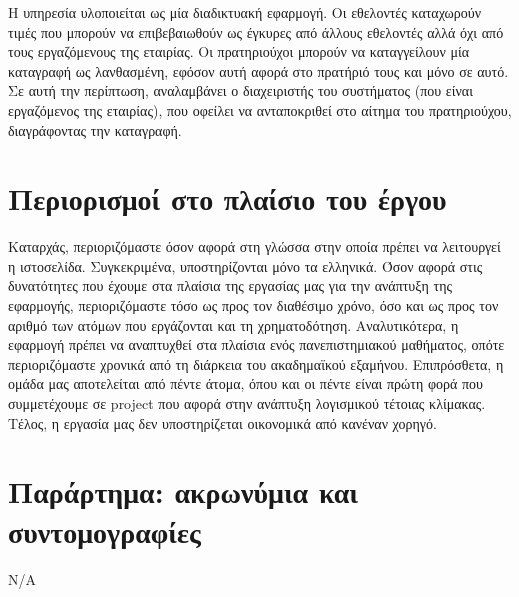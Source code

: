 \documentclass[a4paper,oneside, 12pt]{article}
\begin{document}
Η υπηρεσία υλοποιείται ως μία διαδικτυακή εφαρμογή. Οι εθελοντές
καταχωρούν τιμές που μπορούν να επιβεβαιωθούν ως έγκυρες από άλλους
εθελοντές αλλά όχι από τους εργαζόμενους της εταιρίας. Οι πρατηριούχοι
μπορούν να καταγγείλουν μία καταγραφή ως λανθασμένη, εφόσον αυτή αφορά
στο πρατήριό τους και μόνο σε αυτό. Σε αυτή την περίπτωση, αναλαμβάνει ο
διαχειριστής του συστήματος (που είναι εργαζόμενος της εταιρίας), που οφείλει
να ανταποκριθεί στο αίτημα του πρατηριούχου, διαγράφοντας την καταγραφή.

\section{Περιορισμοί στο πλαίσιο του έργου}

Καταρχάς, περιοριζόμαστε όσον αφορά στη γλώσσα στην οποία πρέπει να
λειτουργεί η ιστοσελίδα. Συγκεκριμένα, υποστηρίζονται μόνο τα ελληνικά.
Όσον αφορά στις δυνατότητες που έχουμε στα πλαίσια της εργασίας μας για
την ανάπτυξη της εφαρμογής, περιοριζόμαστε τόσο ως προς τον διαθέσιμο
χρόνο, όσο και ως προς τον αριθμό των ατόμων που εργάζονται και τη
χρηματοδότηση. Αναλυτικότερα, η εφαρμογή πρέπει να αναπτυχθεί στα πλαίσια
ενός πανεπιστημιακού μαθήματος, οπότε περιοριζόμαστε χρονικά από τη
διάρκεια του ακαδημαϊκού εξαμήνου. Επιπρόσθετα, η ομάδα μας αποτελείται
από πέντε άτομα, όπου και οι πέντε είναι πρώτη φορά που συμμετέχουμε σε
project που αφορά στην ανάπτυξη λογισμικού τέτοιας κλίμακας. Τέλος, η
εργασία μας δεν υποστηρίζεται οικονομικά από κανέναν χορηγό.

\section{Παράρτημα: ακρωνύμια και συντομογραφίες}

Ν/Α
\end{document}
